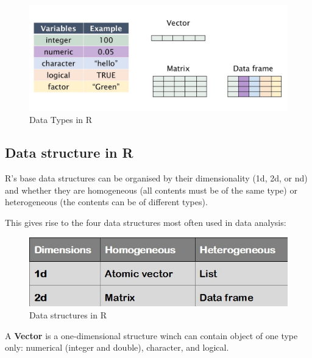 \documentclass[
]{book}
\theoremstyle{definition}
\theoremstyle{definition}
\theoremstyle{definition}
\theoremstyle{definition}
\theoremstyle{remark}
\begin{document}
\begin{figure}

{\centering \includegraphics[width=1\linewidth,height=0.8\textheight]{images/Rvariablesdata} 

}

\caption{Data Types in R \label{data_Type}}\label{fig:img1}
\end{figure}

\newpage

\hypertarget{data-structure-in-r}{%
\subsection{Data structure in R}\label{data-structure-in-r}}

R's base data structures can be organised by their dimensionality (1d, 2d, or nd) and whether they are homogeneous (all contents must be of the same type) or heterogeneous (the contents can be of different types).

This gives rise to the four data structures most often used in data analysis:

\begin{figure}

{\centering \includegraphics[width=0.5\linewidth,height=0.6\textheight]{images/data_type} 

}

\caption{Data structures in R \label{data_str}}\label{fig:img2}
\end{figure}

A \textbf{Vector} is a one-dimensional structure winch can contain object of one type only: numerical (integer and double), character, and logical.
\end{document}
